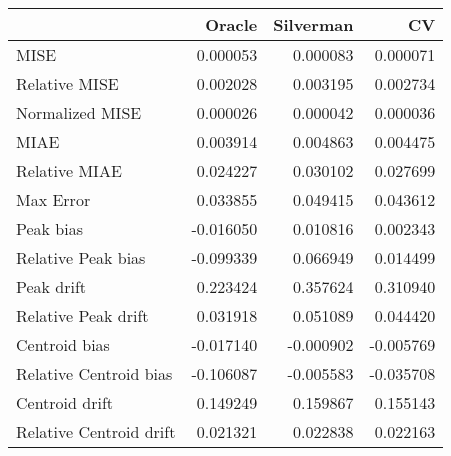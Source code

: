 \begin{tabular}{lrrr}
  \hline
 & Oracle & Silverman & CV \\ 
  \hline
MISE & 0.000053 & 0.000083 & 0.000071 \\ 
  Relative MISE & 0.002028 & 0.003195 & 0.002734 \\ 
  Normalized MISE & 0.000026 & 0.000042 & 0.000036 \\ 
  MIAE & 0.003914 & 0.004863 & 0.004475 \\ 
  Relative MIAE & 0.024227 & 0.030102 & 0.027699 \\ 
  Max Error & 0.033855 & 0.049415 & 0.043612 \\ 
  Peak bias & -0.016050 & 0.010816 & 0.002343 \\ 
  Relative Peak bias & -0.099339 & 0.066949 & 0.014499 \\ 
  Peak drift & 0.223424 & 0.357624 & 0.310940 \\ 
  Relative Peak drift & 0.031918 & 0.051089 & 0.044420 \\ 
  Centroid bias & -0.017140 & -0.000902 & -0.005769 \\ 
  Relative Centroid bias & -0.106087 & -0.005583 & -0.035708 \\ 
  Centroid drift & 0.149249 & 0.159867 & 0.155143 \\ 
  Relative Centroid drift & 0.021321 & 0.022838 & 0.022163 \\ 
   \hline
\end{tabular}

